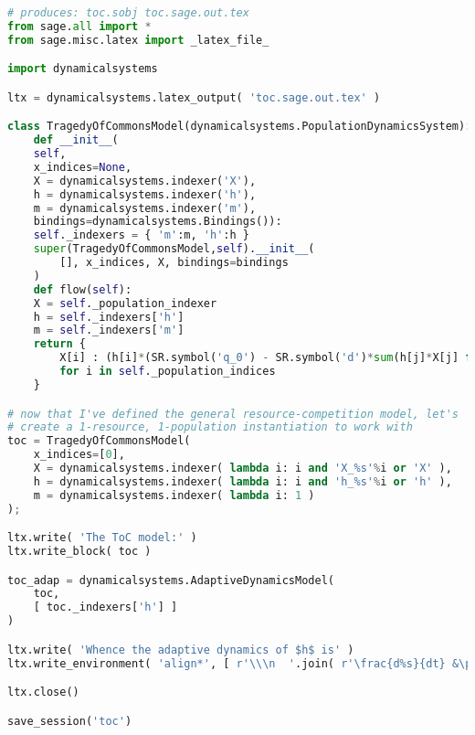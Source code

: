 \begin{lstlisting}[language=Python]
# produces: toc.sobj toc.sage.out.tex
from sage.all import * 
from sage.misc.latex import _latex_file_

import dynamicalsystems

ltx = dynamicalsystems.latex_output( 'toc.sage.out.tex' )

class TragedyOfCommonsModel(dynamicalsystems.PopulationDynamicsSystem):
    def __init__(
	self,
	x_indices=None,
	X = dynamicalsystems.indexer('X'),
	h = dynamicalsystems.indexer('h'),
	m = dynamicalsystems.indexer('m'),
	bindings=dynamicalsystems.Bindings()):
	self._indexers = { 'm':m, 'h':h }
	super(TragedyOfCommonsModel,self).__init__(
	    [], x_indices, X, bindings=bindings
	)
    def flow(self):
	X = self._population_indexer
	h = self._indexers['h']
	m = self._indexers['m']
	return {
	    X[i] : (h[i]*(SR.symbol('q_0') - SR.symbol('d')*sum(h[j]*X[j] for j in self._population_indices)) - m[i]) * X[i]
	    for i in self._population_indices
	}

# now that I've defined the general resource-competition model, let's
# create a 1-resource, 1-population instantiation to work with
toc = TragedyOfCommonsModel(
    x_indices=[0],
    X = dynamicalsystems.indexer( lambda i: i and 'X_%s'%i or 'X' ),
    h = dynamicalsystems.indexer( lambda i: i and 'h_%s'%i or 'h' ),
    m = dynamicalsystems.indexer( lambda i: 1 )
);

ltx.write( 'The ToC model:' )
ltx.write_block( toc )

toc_adap = dynamicalsystems.AdaptiveDynamicsModel( 
    toc,
    [ toc._indexers['h'] ]
)

ltx.write( 'Whence the adaptive dynamics of $h$ is' )
ltx.write_environment( 'align*', [ r'\\\n  '.join( r'\frac{d%s}{dt} &\propto %s' % (latex(v), latex(toc_adap._S[v])) for v in toc_adap._vars ) ] )

ltx.close()

save_session('toc')
\end{lstlisting}
